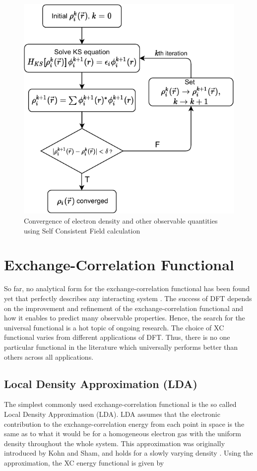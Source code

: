 \begin{figure}[tbh!]
	\centering
	\includegraphics[width=0.7\linewidth]{"images/scf_loop"}
	\caption[Kohn Sham loop]{Convergence of electron density and other observable quantities using Self Consistent Field calculation}
	\label{fig:scf_loop}
\end{figure}
\section{Exchange-Correlation Functional}
So far, no analytical form for the exchange-correlation functional has been found yet that perfectly describes any interacting system \citep{Verma2020,Marques2012,Segala2009}. The success of DFT depends on the improvement and refinement of the exchange-correlation functional and how it enables to predict many observable properties. Hence, the search for the universal functional is a hot topic of ongoing research. The choice of XC functional varies from different applications of DFT. Thus, there is no one particular functional in the literature which universally performs better than others across all applications.

    \subsection{Local Density Approximation (LDA)}
    The simplest commonly used exchange-correlation functional is the so called Local Density Approximation (LDA).  LDA assumes that the electronic contribution to the exchange-correlation energy from each point in space is the same as to what it would be for a homogeneous electron gas with the uniform density throughout the whole system. This approximation was originally introduced by Kohn and Sham, and holds for a slowly varying density \citep{Kohn1965}. Using the approximation, the XC energy functional is given by 

